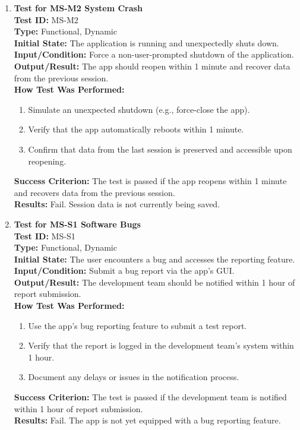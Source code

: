 \documentclass[12pt, titlepage]{article}
\begin{document}
\begin{enumerate}
    \item \textbf{Test for MS-M2 System Crash} \\
      \newline
      \textbf{Test ID:} MS-M2 \\
      \textbf{Type:} Functional, Dynamic \\
      \textbf{Initial State:} The application is running and unexpectedly shuts down. \\
      \textbf{Input/Condition:} Force a non-user-prompted shutdown of the application. \\
      \textbf{Output/Result:} The app should reopen within 1 minute and recover data from the previous session. \\
      \textbf{How Test Was Performed:}
      \begin{enumerate}
          \item Simulate an unexpected shutdown (e.g., force-close the app).
          \item Verify that the app automatically reboots within 1 minute.
          \item Confirm that data from the last session is preserved and accessible upon reopening.
      \end{enumerate}
      \textbf{Success Criterion:} The test is passed if the app reopens within 1 minute and recovers data from the previous session.\\
      \textbf{Results:} Fail. Session data is not currently being saved.\\

    \item \textbf{Test for MS-S1 Software Bugs} \\
      \newline
      \textbf{Test ID:} MS-S1 \\
      \textbf{Type:} Functional, Dynamic \\
      \textbf{Initial State:} The user encounters a bug and accesses the reporting feature. \\
      \textbf{Input/Condition:} Submit a bug report via the app’s GUI. \\
      \textbf{Output/Result:} The development team should be notified within 1 hour of report submission. \\
      \textbf{How Test Was Performed:}
      \begin{enumerate}
          \item Use the app’s bug reporting feature to submit a test report.
          \item Verify that the report is logged in the development team’s system within 1 hour.
          \item Document any delays or issues in the notification process.
      \end{enumerate}
      \textbf{Success Criterion:} The test is passed if the development team is notified within 1 hour of report submission.\\
      \textbf{Results:} Fail. The app is not yet equipped with a bug reporting feature.\\


\end{enumerate}
\end{document}
